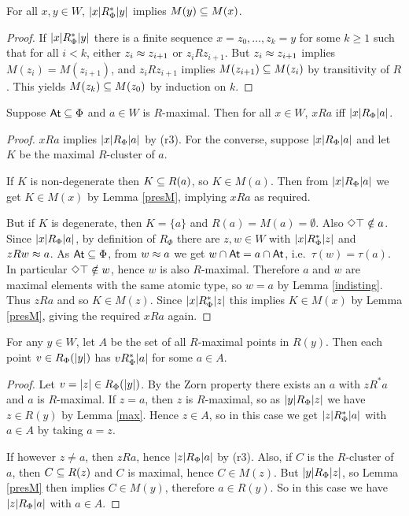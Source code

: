 \begin{lemma} \label{presM}
For all $x,y\in W$, $|x|R_\Phi^*|y|$ implies $M(y)\subseteq M(x)$.
\end{lemma}
\begin{proof}
If $|x|R_\Phi^*|y|$ there is a finite sequence $x=z_0,\dots,z_k=y$ for some $k\geq 1$ such that for all $i<k$, either $z_i\approx z_{i+1}$ or  $z_iR z_{i+1}$.
But $z_i\approx z_{i+1}$ implies $M(z_i)=M(z_{i+1})$, and  $z_iR z_{i+1}$ implies $M(z_{i+1})\subseteq M(z_i)$ by transitivity of $R$. This yields $M(z_{k})\subseteq M(z_0)$ by induction on $k$.
\end{proof}


\begin{lemma} \label{max}
Suppose $\mathsf{At}\subseteq\Phi$ and
$a\in W$ is $R$-maximal. Then for all $x\in W$,  $xRa$  iff\/ $|x|R_\Phi|a|$.
\end{lemma}
\begin{proof}
$xRa$ implies $|x|R_\Phi|a|$ by (r3). For the converse, suppose $|x|R_\Phi|a|$
and let  $K$ be the maximal $R$-cluster of $a$. 

If $K$ is non-degenerate then $K\subseteq R(a)$, so $K\in M(a)$. Then from $|x|R_\Phi|a|$ we get $K\in M(x)$ by  Lemma \ref{presM}, implying $xRa$ as required. 

But if $K$ is degenerate, then $K=\{a\}$ and $R(a)=M(a)=\emptyset$. Also $\Diamond\top\notin a$. Since $|x|R_\Phi|a|$, by definition of $R_\Phi$ there are $z,w\in W$ with $|x|R_\Phi^*|z|$ and $zRw\approx a$. As $\mathsf{At}\subseteq\Phi$, from $w\approx a$ we get $w\cap\mathsf{At}=a\cap\mathsf{At}$, i.e.\ $\tau(w)=\tau(a)$. In particular $\Diamond\top\notin w$, hence $w$ is also $R$-maximal. Therefore $a$ and $w$ are maximal elements with the same atomic type, so $w=a$ by Lemma \ref{indisting}. Thus $zRa$ and so $K\in M(z)$.
Since $|x|R_\Phi^*|z|$ this implies $K\in M(x)$ by Lemma \ref{presM}, giving the required $xRa$ again.
\end{proof}

\begin{lemma} \label{R*max}
For any $y\in W$, let $A$ be the set of all $R$-maximal points in $R(y)$.
Then each  point $v\in R_\Phi(|y|)$ has $vR_\Phi^*|a|$ for some $a\in A$. 
\end{lemma}
\begin{proof}
Let $v=|z|\in R_\Phi(|y|)$. By the Zorn property there exists an $a$ with $zR^*a$ and $a$ is $R$-maximal.
If $z=a$, then $z$ is $R$-maximal, so as $|y|R_\Phi|z|$ we have $z\in R(y)$ by Lemma \ref{max}. Hence $z\in A$, so in this case we get $|z|R_\Phi^*|a|$ with $a\in A$ by taking $a=z$.

If however $z\ne a$, then $zRa$, hence $|z|R_\Phi|a|$ by (r3).  Also, if $C$ is the $R$-cluster of $a$, then $C\subseteq R(z)$ and $C$ is maximal, hence $C\in M(z)$. But $|y|R_\Phi|z|$, so Lemma \ref{presM} then implies $C\in M(y)$, therefore  $a\in R(y)$. So in this case  we have $|z|R_\Phi|a|$ with $a\in A$. 
\end{proof}


